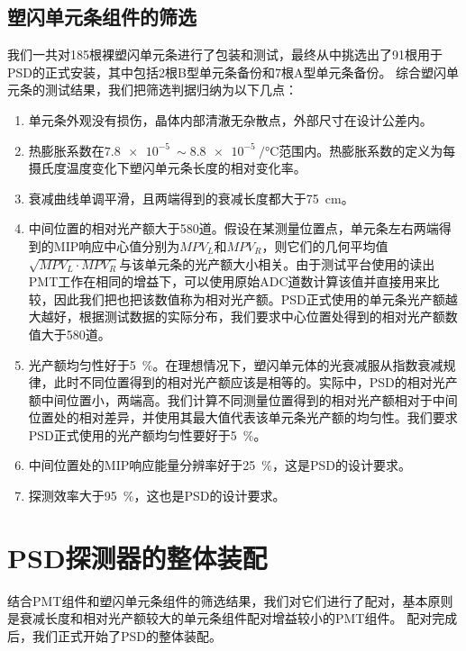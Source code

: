 \subsection{塑闪单元条组件的筛选}
\label{sec:construction:bar_selection}
我们一共对185根裸塑闪单元条进行了包装和测试，最终从中挑选出了91根用于PSD的正式安装，其中包括2根B型单元条备份和7根A型单元条备份。
综合塑闪单元条的测试结果，我们把筛选判据归纳为以下几点：
\begin{enumerate}
	\item 单元条外观没有损伤，晶体内部清澈无杂散点，外部尺寸在设计公差内。
	\item 热膨胀系数在$\SI{7.8e-5}{}\sim \SI{8.8e-5}{\per\celsius}$范围内。热膨胀系数的定义为每摄氏度温度变化下塑闪单元条长度的相对变化率。
	\item 衰减曲线单调平滑，且两端得到的衰减长度都大于\SI{75}{cm}。
	\item 中间位置的相对光产额大于580道。假设在某测量位置点，单元条左右两端得到的MIP响应中心值分别为$MPV_L$和$MPV_R$，则它们的几何平均值$\sqrt{MPV_L \cdot MPV_R}$与该单元条的光产额大小相关。由于测试平台使用的读出PMT工作在相同的增益下\parencite{bar_test_2015}，可以使用原始ADC道数计算该值并直接用来比较，因此我们把也把该数值称为相对光产额。PSD正式使用的单元条光产额越大越好，根据测试数据的实际分布，我们要求中心位置处得到的相对光产额数值大于580道。
	\item 光产额均匀性好于\SI{5}{\percent}。在理想情况下，塑闪单元体的光衰减服从指数衰减规律，此时不同位置得到的相对光产额应该是相等的。实际中，PSD的相对光产额中间位置小，两端高。我们计算不同测量位置得到的相对光产额相对于中间位置处的相对差异，并使用其最大值代表该单元条光产额的均匀性。我们要求PSD正式使用的光产额均匀性要好于\SI{5}{\percent}。
	\item 中间位置处的MIP响应能量分辨率好于\SI{25}{\percent}，这是PSD的设计要求。
	\item 探测效率大于\SI{95}{\percent}，这也是PSD的设计要求。
\end{enumerate}

\section{PSD探测器的整体装配}
\label{sec:construction:psd_assembly}

结合PMT组件和塑闪单元条组件的筛选结果，我们对它们进行了配对，基本原则是衰减长度和相对光产额较大的单元条组件配对增益较小的PMT组件。
配对完成后，我们正式开始了PSD的整体装配。

